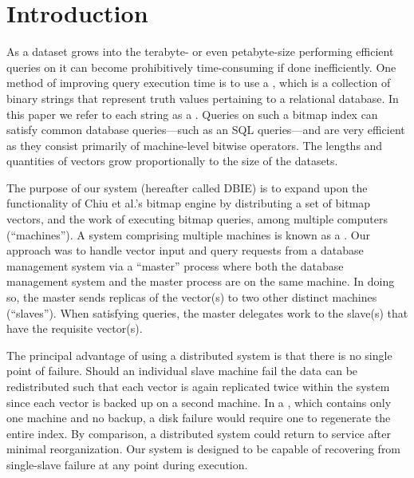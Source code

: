 \section{Introduction}
As a dataset grows into the terabyte- or even petabyte-size performing efficient
queries on it can become prohibitively time-consuming if done
inefficiently. One method of improving query execution time is to use a
, which is a collection of binary strings that represent
truth values pertaining to a relational database. In this paper we refer
to each string as a . Queries on such a bitmap index can
satisfy common database queries---such as an SQL 
queries---and are very efficient as they consist primarily of machine-level
bitwise operators. The lengths and quantities of vectors grow proportionally to
the size of the datasets. \cite{}
\par
The purpose of our system (hereafter called DBIE) is to expand upon the
functionality of Chiu et al.'s bitmap engine by distributing a set of bitmap
vectors, and the work of executing bitmap queries, among multiple computers
(``machines''). A system comprising multiple machines is known as a
. Our approach was to handle vector input and query
requests from a database management system via a ``master'' process where both
the database management system and the master process are on the same machine.
In doing so, the master sends replicas of the vector(s) to two other distinct
machines (``slaves''). When satisfying queries, the master delegates work to
the slave(s) that have the requisite vector(s).
\par
The principal advantage of using a distributed system is that there is no
single point of failure. Should an individual slave machine fail the data can
be redistributed such that each vector is again replicated twice within the
system since each vector is backed up on a second machine. In a
, which contains only one machine and no backup, a
disk failure would require one to regenerate the entire index. By comparison,
a distributed system could return to service after minimal reorganization. Our
system is designed to be capable of recovering from single-slave failure at any
point during execution.

